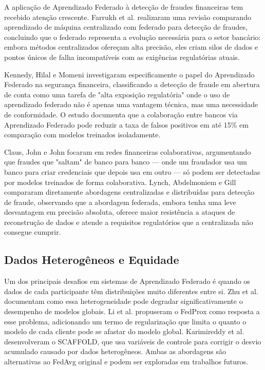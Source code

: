 A aplicação de Aprendizado Federado à detecção de fraudes financeiras tem recebido atenção crescente. Farrukh et al. \cite{farrukh2025blockchain} realizaram uma revisão comparando aprendizado de máquina centralizado com federado para detecção de fraudes, concluindo que o federado representa a evolução necessária para o setor bancário: embora métodos centralizados ofereçam alta precisão, eles criam silos de dados e pontos únicos de falha incompatíveis com as exigências regulatórias atuais.

Kennedy, Hilal e Momeni \cite{kennedy2025financial} investigaram especificamente o papel do Aprendizado Federado na segurança financeira, classificando a detecção de fraude em abertura de conta como uma tarefa de "alta exposição regulatória" onde o uso de aprendizado federado não é apenas uma vantagem técnica, mas uma necessidade de conformidade. O estudo documenta que a colaboração entre bancos via Aprendizado Federado pode reduzir a taxa de falsos positivos em até 15\% em comparação com modelos treinados isoladamente.

Claus, John e John \cite{claus2025collaborative} focaram em redes financeiras colaborativas, argumentando que fraudes que "saltam" de banco para banco --- onde um fraudador usa um banco para criar credenciais que depois usa em outro --- só podem ser detectadas por modelos treinados de forma colaborativa. Lynch, Abdelmoniem e Gill \cite{lynch2024fraud} compararam diretamente abordagens centralizadas e distribuídas para detecção de fraude, observando que a abordagem federada, embora tenha uma leve desvantagem em precisão absoluta, oferece maior resistência a ataques de reconstrução de dados e atende a requisitos regulatórios que a centralizada não consegue cumprir.

\subsection{Dados Heterogêneos e Equidade}

Um dos principais desafios em sistemas de Aprendizado Federado é quando os dados de cada participante têm distribuições muito diferentes entre si. Zhu et al. \cite{zhu2021noniid} documentam como essa heterogeneidade pode degradar significativamente o desempenho de modelos globais. Li et al. \cite{li2020fedprox} propuseram o FedProx como resposta a esse problema, adicionando um termo de regularização que limita o quanto o modelo de cada cliente pode se afastar do modelo global. Karimireddy et al. \cite{karimireddy2020scaffold} desenvolveram o SCAFFOLD, que usa variáveis de controle para corrigir o desvio acumulado causado por dados heterogêneos. Ambas as abordagens são alternativas ao FedAvg original e podem ser exploradas em trabalhos futuros.

